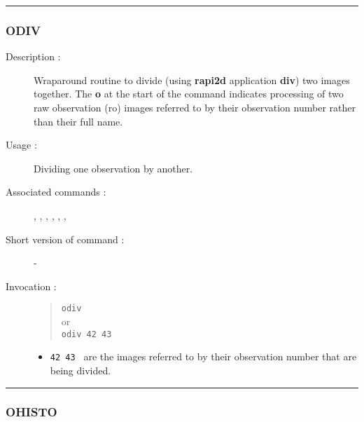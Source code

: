 \hrule
\subsubsection*{\label{ODIV}ODIV}

\begin{description}

\item[Description :] Wraparound routine to divide (using {\bf rapi2d}
application {\bf div}) two images together. The {\bf o} at the start of
the command indicates processing of two raw observation ({\sc ro})
images referred to by their observation number rather than their full
name.

\item[Usage :] Dividing one observation by another.

\item[Associated commands :] {\tt {}},
{\tt {}}, {\tt {}},
{\tt {}}, {\tt {}},
{\tt {}}, {\tt {}}

\item[Short version of command :] -
\item[Invocation :]

\begin{quote}{\tt  odiv }\\
or \\
{\tt odiv 42 43 }
\end{quote}

\begin{itemize}

\item {\tt 42 43 } are the images referred to by their observation number
 that are being divided.
\end{itemize}

\end{description}

\hrule
\subsubsection*{\label{OHISTO}OHISTO}

